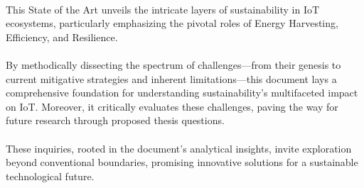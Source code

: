 \documentclass[12pt,a4paper]{article}
\begin{document}
        \paragraph{}
        This State of the Art unveils the intricate layers of sustainability in IoT ecosystems, particularly emphasizing the pivotal roles of Energy Harvesting, Efficiency, and Resilience.
        
        \paragraph{}
        By methodically dissecting the spectrum of challenges—from their genesis to current mitigative strategies and inherent limitations—this document lays a comprehensive foundation for understanding sustainability's multifaceted impact on IoT. Moreover, it critically evaluates these challenges, paving the way for future research through proposed thesis questions.
        
        \paragraph{}
        These inquiries, rooted in the document’s analytical insights, invite exploration beyond conventional boundaries, promising innovative solutions for a sustainable technological future.

    \newpage
    
    
    			
    




    
    \newpage
    \printglossary[type=\acronymtype]
    \printglossary[type=main]

    \printbibliography[heading=bibintoc]
\end{document}
